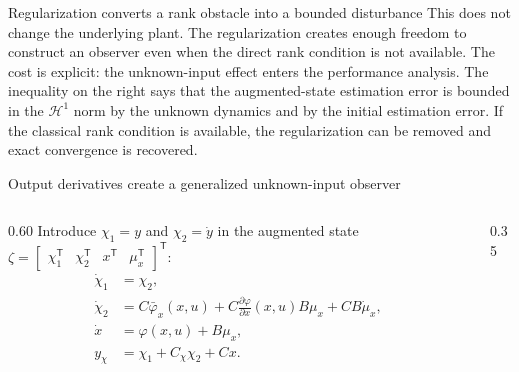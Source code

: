\documentclass[aspectratio=169,10pt]{beamer}
\newcommand{\speakernote}[1]{\note{\scriptsize #1}}
\newcommand{\T}{\mathsf T}
\begin{document}
\begin{frame}{Regularization converts a rank obstacle into a bounded disturbance}
{  This does not change the underlying plant. The regularization creates enough freedom to construct an observer even when the direct rank condition is not available. The cost is explicit: the unknown-input effect enters the performance analysis. The inequality on the right says that the augmented-state estimation error is bounded in the $\mathcal H^1$ norm by the unknown dynamics and by the initial estimation error. If the classical rank condition is available, the regularization can be removed and exact convergence is recovered.
}
\end{frame}

\begin{frame}{Output derivatives create a generalized unknown-input observer}
\begin{columns}[T,onlytextwidth]
  \begin{column}{0.60\textwidth}
    \vspace{0.05cm}
    \small
    Introduce $\chi_1=y$ and $\chi_2=\dot y$ in the augmented state
    $\zeta=\begin{bmatrix}\chi_1^\T&\chi_2^\T&x^\T&\mu_x^\T\end{bmatrix}^\T$:
    \begin{align*}
      \dot\chi_1&=\chi_2,\\[-1mm]
      \dot\chi_2&=C\bar\varphi_x(x,u)
        +C\frac{\partial\varphi}{\partial x}(x,u)B\mu_x+CB\dot\mu_x,\\[-1mm]
      \dot{x}&=\varphi(x,u)+B\mu_x,\\[-1mm]
      y_\chi&=\chi_1+C_\chi\chi_2+Cx.
    \end{align*}
  \end{column}
  \begin{column}{0.35\textwidth}
    \vspace{0.22cm}
  \end{column}
\end{columns}
\speakernote{
}
\end{frame}
\end{document}
